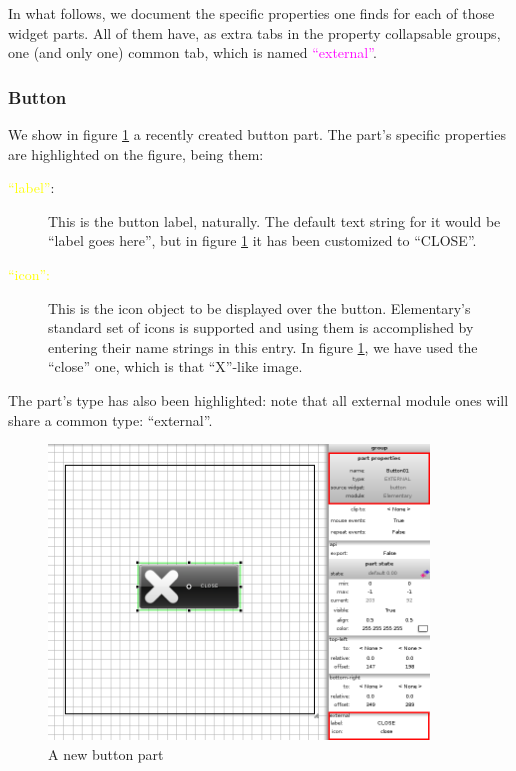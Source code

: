 \documentclass[a4paper]{profusion}
\newcommand{\GUILabel}[1]{\textcolor{magenta}{#1}}
\newcommand{\GUIEditable}[1]{\textcolor{yellow}{#1}} %
\begin{document}
In what follows, we document the specific properties one finds for
each of those widget parts. All of them have, as extra tabs in the
property collapsable groups, one (and only one) common tab, which is
named \GUILabel{``external''}.

\subsubsection{Button}

We show in figure \ref{fig:new_button} a recently created button part.
The part's specific properties are highlighted on the figure, being
them:

\begin{description}
  \item[\GUIEditable{``label''}:] This is the button label,
    naturally. The default text string for it would be ``label goes
    here'', but in figure \ref{fig:new_button} it has been customized
    to ``CLOSE''.
  \item[\GUIEditable{``icon'':}] This is the icon object to be
    displayed over the button. Elementary's standard set of icons is
    supported and using them is accomplished by entering their name
    strings in this entry. In figure \ref{fig:new_button}, we have
    used the ``close'' one, which is that ``X''-like image.
\end{description}

The part's type has also been highlighted: note that all external
module ones will share a common type: ``external''.

\begin{figure}[h!]
  \centering
  \includegraphics[width=0.9\textwidth]{images/new_button.png}
  \caption{A new button part}
  \label{fig:new_button}
\end{figure}
\end{document}
